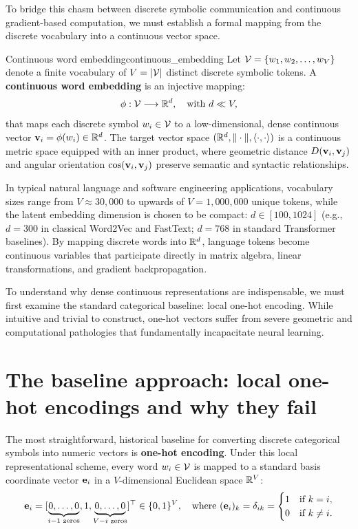 \documentclass[../../main.tex]{subfiles}
\begin{document}
To bridge this chasm between discrete symbolic communication and continuous gradient-based computation, we must establish a formal mapping from the discrete vocabulary into a continuous vector space.

\begin{definition}{Continuous word embedding}{continuous_embedding}
Let $\mathcal{V} = \{w_1, w_2, \dots, w_V\}$ denote a finite vocabulary of $V = |\mathcal{V}|$ distinct discrete symbolic tokens. A \textbf{continuous word embedding} is an injective mapping:
\begin{equation}
\label{eq:embedding_mapping_def}
\phi: \mathcal{V} \longrightarrow \mathbb{R}^d, \quad \text{with } d \ll V,
\end{equation}
that maps each discrete symbol $w_i \in \mathcal{V}$ to a low-dimensional, dense continuous vector $\mathbf{v}_i = \phi(w_i) \in \mathbb{R}^d$. The target vector space $(\mathbb{R}^d, \|\cdot\|, \langle\cdot, \cdot\rangle)$ is a continuous metric space equipped with an inner product, where geometric distance $D(\mathbf{v}_i, \mathbf{v}_j)$ and angular orientation $\cos(\mathbf{v}_i, \mathbf{v}_j)$ preserve semantic and syntactic relationships.
\end{definition}

In typical natural language and software engineering applications, vocabulary sizes range from $V \approx 30{,}000$ to upwards of $V = 1{,}000{,}000$ unique tokens, while the latent embedding dimension is chosen to be compact: $d \in [100, 1024]$ (e.g., $d = 300$ in classical Word2Vec and FastText; $d = 768$ in standard Transformer baselines). By mapping discrete words into $\mathbb{R}^d$, language tokens become continuous variables that participate directly in matrix algebra, linear transformations, and gradient backpropagation.

To understand why dense continuous representations are indispensable, we must first examine the standard categorical baseline: local one-hot encoding. While intuitive and trivial to construct, one-hot vectors suffer from severe geometric and computational pathologies that fundamentally incapacitate neural learning.

\section{The baseline approach: local one-hot encodings and why they fail}
\label{sec:onehot_baseline}

The most straightforward, historical baseline for converting discrete categorical symbols into numeric vectors is \textbf{one-hot encoding}. Under this local representational scheme, every word $w_i \in \mathcal{V}$ is mapped to a standard basis coordinate vector $\mathbf{e}_i$ in a $V$-dimensional Euclidean space $\mathbb{R}^V$:
\begin{equation}
\label{eq:onehot_def}
\mathbf{e}_i = [\underbrace{0, \dots, 0}_{i-1\text{ zeros}}, 1, \underbrace{0, \dots, 0}_{V-i\text{ zeros}}]^\top \in \{0, 1\}^V, \quad \text{where } (\mathbf{e}_i)_k = \delta_{ik} = \begin{cases} 1 & \text{if } k = i, \\ 0 & \text{if } k \neq i. \end{cases}
\end{equation}
\end{document}
